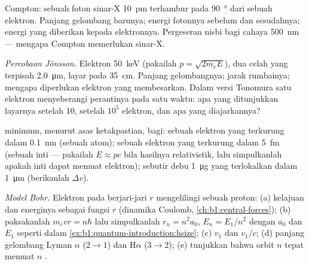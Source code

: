 \begin{exercise}[$\star\star$]\label{exo:b1:quantum-introduction:6}
Compton: sebuah foton sinar-X \qty{10}{pm} terhambur pada \qty{90}{\degree} dari sebuah
elektron. Panjang gelombang barunya; energi fotonnya sebelum dan sesudahnya; energi
yang diberikan kepada elektronnya. Pergeseran nisbi bagi cahaya \qty{500}{nm} --- mengapa
Compton memerlukan sinar-X.
\end{exercise}

\begin{exercise}[$\star\star$]\label{exo:b1:quantum-introduction:7}
\emph{Percobaan Jönsson.} Elektron \qty{50}{keV} (pakailah $p =
\sqrt{2m_eE}$), dua celah yang terpisah \qty{2.0}{\micro m}, layar pada
\qty{35}{cm}. Panjang gelombangnya; jarak rumbainya; mengapa diperlukan 
elektron yang membesarkan. Dalam versi Tonomura satu elektron menyeberangi
perantinya pada satu waktu: apa yang ditunjukkan layarnya setelah 10, setelah $10^5$ elektron,
dan apa yang diajarkannya?
\end{exercise}

\begin{exercise}[$\star\star$]\label{exo:b1:quantum-introduction:8}
 minimum, menurut asas ketakpastian, bagi: sebuah
elektron yang terkurung dalam \qty{0.1}{nm} (sebuah atom); sebuah elektron yang terkurung dalam
\qty{5}{fm} (sebuah inti --- pakailah $E \approx pc$ bila hasilnya
relativistik, lalu simpulkanlah apakah inti dapat memuat elektron); sebutir
debu \qty{1}{\micro g} yang terlokalkan dalam \qty{1}{\micro m} (berikanlah $\Delta v$).
\end{exercise}

\begin{exercise}[$\star\star$]\label{exo:b1:quantum-introduction:9}
\emph{Model Bohr.} Elektron pada  berjari-jari $r$ mengelilingi sebuah
proton: (a) kelajuan dan energinya sebagai fungsi $r$ (dinamika Coulomb,
\cref{ch:b1:central-forces}); (b) paksakanlah $m_evr = n\hbar$ lalu simpulkanlah
$r_n = n^2a_0$, $E_n = E_1/n^2$ dengan $a_0$ dan $E_1$ seperti dalam
\cref{ex:b1:quantum-introduction:hsize}; (c) $v_1$ dan $v_1/c$; (d)
panjang gelombang Lyman $\alpha$ ($2 \to 1$) dan H$\alpha$ ($3 \to 2$);
(e) tunjukkan bahwa orbit $n$ tepat memuat $n$ .
\end{exercise}


